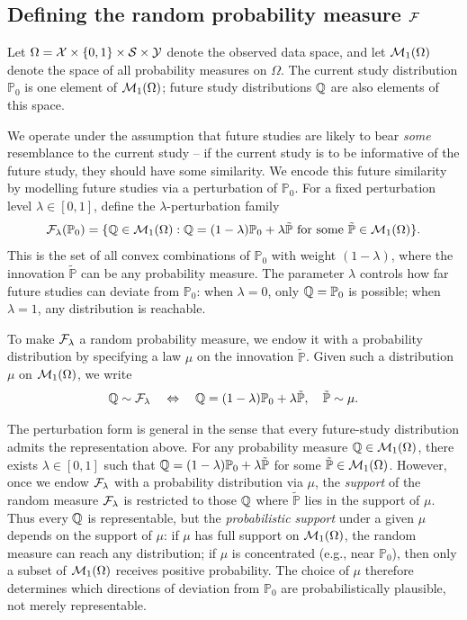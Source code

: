 \documentclass{article}
\newcommand{\PP}{\mathbb{P}}
\begin{document}
\subsection{Defining the random probability measure $\mathcal{F}$}

Let $\Omega = \mathcal{X} \times \{0,1\} \times \mathcal{S} \times \mathcal{Y}$ denote the observed data space, and let $\mathcal{M}_1(\Omega)$ denote the space of all probability measures on $\Omega$. The current study distribution $\PP_0$ is one element of $\mathcal{M}_1(\Omega)$; future study distributions $\mathbb{Q}$ are also elements of this space.

We operate under the assumption that future studies are likely to bear \emph{some} resemblance to the current study -- if the current study is to be informative of the future study, they should have some similarity. We encode this future similarity by modelling future studies via a perturbation of $\PP_0$. For a fixed perturbation level $\lambda \in [0,1]$, define the $\lambda$-perturbation family
\begin{align*}
    \cF_\lambda(\PP_0) = \{\Q \in \cM_1(\Omega) : \Q = (1-\lambda)\PP_0 + \lambda\tilde{\PP} \text{ for some } \tilde{\PP} \in \cM_1(\Omega)\}.
\end{align*}
This is the set of all convex combinations of $\PP_0$ with weight $(1-\lambda)$, where the innovation $\tilde{\PP}$ can be any probability measure. The parameter $\lambda$ controls how far future studies can deviate from $\PP_0$: when $\lambda = 0$, only $\Q = \PP_0$ is possible; when $\lambda = 1$, any distribution is reachable.

To make $\mathcal{F}_\lambda$ a random probability measure, we endow it with a probability distribution by specifying a law $\mu$ on the innovation $\tilde{\PP}$. Given such a distribution $\mu$ on $\mathcal{M}_1(\Omega)$, we write
\begin{align*}
    \Q \sim \cF_\lambda \quad\Leftrightarrow\quad \Q = (1-\lambda)\PP_0 + \lambda\tilde{\PP}, \quad \tilde{\PP} \sim \mu.
\end{align*}

The perturbation form is general in the sense that every future-study distribution admits the representation above. For any probability measure $\mathbb{Q} \in \mathcal{M}_1(\Omega)$, there exists $\lambda \in [0,1]$ such that $\Q = (1-\lambda)\PP_0 + \lambda\tilde{\PP}$ for some $\tilde{\PP} \in \cM_1(\Omega)$. However, once we endow $\mathcal{F}_\lambda$ with a probability distribution via $\mu$, the \emph{support} of the random measure $\mathcal{F}_\lambda$ is restricted to those $\mathbb{Q}$ where $\tilde{\PP}$ lies in the support of $\mu$. Thus every $\mathbb{Q}$ is representable, but the \emph{probabilistic support} under a given $\mu$ depends on the support of $\mu$: if $\mu$ has full support on $\mathcal{M}_1(\Omega)$, the random measure can reach any distribution; if $\mu$ is concentrated (e.g., near $\PP_0$), then only a subset of $\mathcal{M}_1(\Omega)$ receives positive probability. The choice of $\mu$ therefore determines which directions of deviation from $\PP_0$ are probabilistically plausible, not merely representable.
\end{document}
